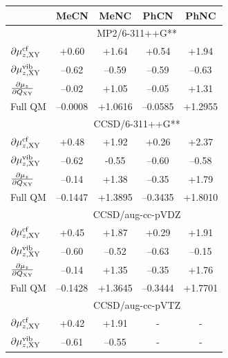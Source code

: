 \documentclass[a4paper,titlepage,twoside,fleqn,12pt]{book}
\newcommand{\fderiv}[2]{\ensuremath{
    \frac{\partial #1}{\partial #2}}}
\begin{document}
\begin{refsection}
\begin{table}[t!]
\begin{tabular*}{1.0\textwidth}{@{\extracolsep{\fill} } l cccc}
\hline\hline
                                          & MeCN      & MeNC     & PhCN     & PhNC     \\
\hline
%
& \multicolumn{4}{c}{MP2/6-311++G**}                                                   \\
$\partial\mu_{z,{\rm XY}}^{\rm cf}$       &   +0.60   &   +1.64  &   +0.54  &   +1.94  \\
$\partial\mu_{z,{\rm XY}}^{\rm vib}$      &  --0.62   &  --0.59  &  --0.59  &  --0.63  \\
$\fderiv{\mu_z}{Q_{\rm XY}}$              &  --0.02   &   +1.05  &  --0.05  &   +1.31  \\
Full QM                                   &  --0.0008 &  +1.0616 & --0.0585 & +1.2955  \\
%
& \multicolumn{4}{c}{CCSD/6-311++G**}                                                  \\
$\partial\mu_{z,{\rm XY}}^{\rm cf}$       &   +0.48   &   +1.92  &   +0.26  &  +2.37   \\
$\partial\mu_{z,{\rm XY}}^{\rm vib}$      &  --0.62   &   -0.55  &  --0.60  & --0.58   \\
$\fderiv{\mu_z}{Q_{\rm XY}}$              &  --0.14   &   +1.38  &  --0.35  &  +1.79   \\
Full QM                                   &  --0.1447 &  +1.3895 & --0.3435 & +1.8010  \\
%
& \multicolumn{4}{c}{CCSD/aug-cc-pVDZ}                                                 \\
$\partial\mu_{z,{\rm XY}}^{\rm cf}$       &   +0.45   &   +1.87  &   +0.29  &  +1.91   \\
$\partial\mu_{z,{\rm XY}}^{\rm vib}$      &  --0.60   &  --0.52  &  --0.63  & --0.15   \\
$\fderiv{\mu_z}{Q_{\rm XY}}$              &  --0.14   &   +1.35  &  --0.35  &  +1.76   \\
Full QM                                   &  --0.1428 &  +1.3645 & --0.3444 & +1.7701  \\
%
& \multicolumn{4}{c}{CCSD/aug-cc-pVTZ}                                                 \\
$\partial\mu_{z,{\rm XY}}^{\rm cf}$       &   +0.42   &   +1.91  &    -     &  -       \\
$\partial\mu_{z,{\rm XY}}^{\rm vib}$      &  --0.61   &  --0.55  &    -     &  -       \\

\end{tabular*}
\end{table}
\end{refsection}
\end{document}
